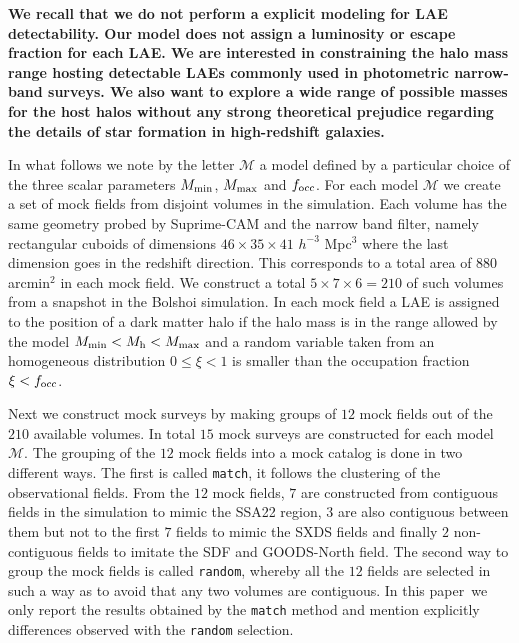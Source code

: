 \documentclass[usenatbib]{mn2e}
\newcommand{\documentname}{paper~}
\begin{document}
{\bf We recall that we do not perform a explicit modeling for LAE
detectability. Our model does not assign a luminosity or escape
fraction for each LAE. We are interested in constraining the halo
mass range hosting detectable LAEs commonly used in photometric
narrow-band surveys. We also want to explore a wide range of
possible masses for the host halos without any strong theoretical
prejudice regarding the details of star formation in high-redshift
galaxies. }


In what follows we note by the letter ${\mathcal M}$ a model
defined by a particular choice of the three scalar parameters $M_{\rm
  min}$, $M_{\rm  max}$ and $f_{\rm occ}$. For each model ${\mathcal
  M}$ we create a set of mock fields from disjoint volumes in the
simulation. Each volume has the same geometry probed by Suprime-CAM
and the narrow band filter, namely rectangular cuboids of dimensions
$46\times 35\times 41$ $h^{-3}$ Mpc$^{3}$ where the last dimension goes
in the redshift direction. This corresponds to a total area of $880$
arcmin$^{2}$ in each mock field. We construct a total $5\times 7
\times 6=210$ of such volumes from a snapshot in the Bolshoi
simulation. In each mock field a LAE is assigned to the position of a
dark matter halo if the halo mass is in the range allowed by the model
$M_{\rm min}<M_{\rm h}<M_{\rm max}$ and a random variable taken from
an homogeneous distribution $0\leq \xi<1$ is smaller than the occupation
fraction $\xi<f_{\rm occ}$.

Next we construct mock surveys by making groups of $12$ mock fields
out of the $210$ available volumes. In total $15$ mock surveys are
constructed for each model $\mathcal{M}$. The grouping of the $12$
mock fields into a mock catalog is done in two different ways. The
first is called {\texttt{match}}, it follows the clustering of the
observational fields. From the $12$ mock fields, $7$ are constructed
from contiguous fields in the simulation to mimic the SSA22 region,
$3$ are also contiguous between them but not to the first $7$ fields
to mimic the SXDS fields and finally $2$ non-contiguous fields to
imitate the SDF and GOODS-North field.   The second way to group the
mock fields is called {\texttt{random}}, whereby all the $12$ fields
are selected in such a way as to avoid that any two volumes are
contiguous. In this \documentname we only report the results obtained
by the {\texttt{match}} method and mention explicitly differences
observed with the {\texttt{random}} selection. 
\end{document}

